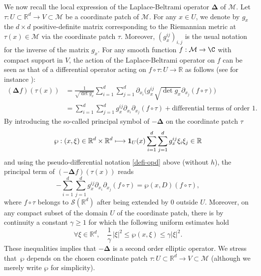\documentclass[JEP,XML,SOM,Unicode,NoEqCountersInSection,published]{cedram}
\def\mto{\mathchoice{\longmapsto}{\mapsto}{\mapsto}{\mapsto}}
\theoremstyle{theorem}
\theoremstyle{definition}
\newcommand\Deltag{\mathbf{\Delta}}
\newcommand\R{\mathbb{R}}
\newcommand\pun{\mathbf{1}}
\begin{document}
We now recall the local expression of the Laplace-Beltrami operator $\Deltag$ of $\mathcal{M}$.
Let $\tau:U\subset \R^d \to V\subset \mathcal{M}$ be a coordinate patch of $\mathcal{M}$.
For any $x\in U$, we denote by $g_{x}$ the $d\times d$ positive-definite matrix corresponding to the Riemannian metric at $\tau(x)\in \mathcal{M}$ via the coordinate patch $\tau$.
Moreover, $(g_x^{ij})_{i,j}$ is the usual notation for the inverse of the matrix $g_x$.
For any smooth function $f:\mathcal{M}\to \C$ with compact support in $V$, the action of the Laplace-Beltrami operator on $f$ can be seen as that of a differential operator acting on $f\circ \tau:U\to \R$ as follows (see for instance \cite[p.\,167]{shub-pseudo}):
\begin{align*}
(\Deltag f)(\tau(x))& = \frac{1}{\sqrt{\det g_{x}}}\sum_{i=1}^d \sum_{j=1}^d \partial_{x_i} \Big(g_{x}^{ij} \sqrt{\det g_{x}} \partial_{x_j} (f\circ \tau) \Big) \\
& = \sum_{i=1}^d \sum_{j=1}^d g_x^{ij} \partial_{x_i} \partial_{x_j} (f\circ \tau) +\text{differential terms of order }1.
\end{align*}
By introducing the so-called principal symbol of $-\Deltag$ on the coordinate patch $\tau$
\begin{equation}\label{prin-sy}
\wp:(x,\xi)\in \R^d\times \R^d \mto \pun_{U}(x)\sum_{i=1}^d \sum_{j=1}^d g_x^{ij} \xi_i \xi_j\in\R
\end{equation}
and using the pseudo-differential notation \eqref{defi-opd} above (without $h$), the principal term of $(-\Deltag f)(\tau(x))$ reads
\begin{equation*}
-\sum_{i=1}^d \sum_{j=1}^d g_x^{ij}\partial_{x_i} \partial_{x_j} (f\circ \tau) =\wp(x,D)(f\circ\tau),
\end{equation*}
where $f\circ \tau$ belongs to $\mathcal{S}(\R^d)$ after being extended by $0$ outside $U$.
Moreover, on any compact subset of the domain $U$ of the coordinate patch, there is by continuity a constant $\gamma\geq 1$ for which the following uniform estimates hold
\begin{equation}\label{sym-p2}
\forall \xi\in \R^d,\quad \frac{1}{\gamma}\,|\xi|^2\leq \wp(x,\xi)\leq \gamma|\xi|^2.
\end{equation}
These inequalities implies that $-\Deltag$ is a second order elliptic operator.
We stress that~$\wp$ depends on the chosen coordinate patch $\tau:U\subset \R^d\to V\subset \mathcal{M}$ (although we merely write $\wp$ for simplicity).
\end{document}
